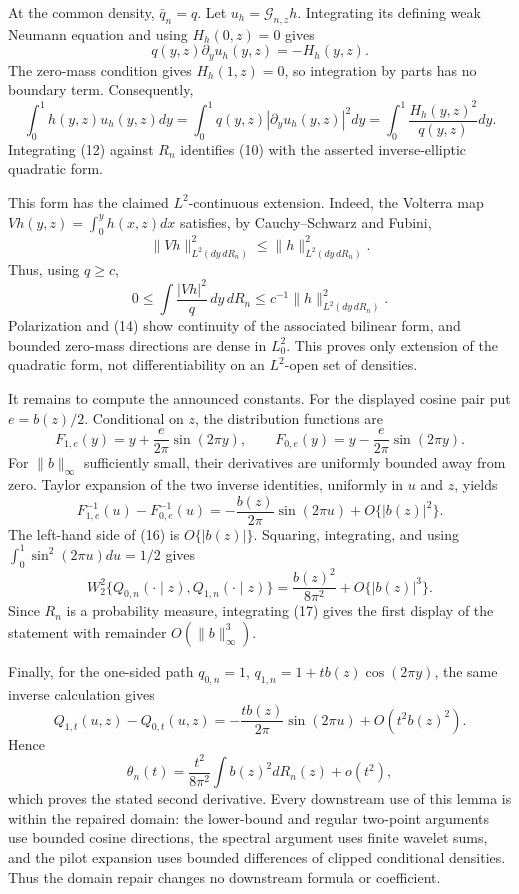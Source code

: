 At the common density, \(\bar q_n=q\). Let \(u_h=\mathcal G_{n,z}h\). Integrating its defining weak Neumann equation and using \(H_h(0,z)=0\) gives
\[
q(y,z)\partial_yu_h(y,z)=-H_h(y,z).
\tag{11}
\]
The zero-mass condition gives \(H_h(1,z)=0\), so integration by parts has no boundary term. Consequently,
\[
\int_0^1h(y,z)u_h(y,z)dy
=\int_0^1q(y,z)|\partial_yu_h(y,z)|^2dy
=\int_0^1\frac{H_h(y,z)^2}{q(y,z)}dy.
\tag{12}
\]
Integrating (12) against \(R_n\) identifies (10) with the asserted inverse-elliptic quadratic form.

This form has the claimed \(L^2\)-continuous extension. Indeed, the Volterra map \(Vh(y,z)=\int_0^yh(x,z)dx\) satisfies, by Cauchy--Schwarz and Fubini,
\[
\|Vh\|_{L^2(dy\,dR_n)}^2
\le\|h\|_{L^2(dy\,dR_n)}^2.
\tag{13}
\]
Thus, using \(q\ge c\),
\[
0\le\int\frac{|Vh|^2}{q}\,dy\,dR_n
\le c^{-1}\|h\|_{L^2(dy\,dR_n)}^2.
\tag{14}
\]
Polarization and (14) show continuity of the associated bilinear form, and bounded zero-mass directions are dense in \(L_0^2\). This proves only extension of the quadratic form, not differentiability on an \(L^2\)-open set of densities.

It remains to compute the announced constants. For the displayed cosine pair put \(e=b(z)/2\). Conditional on \(z\), the distribution functions are
\[
F_{1,e}(y)=y+\frac{e}{2\pi}\sin(2\pi y),
\qquad
F_{0,e}(y)=y-\frac{e}{2\pi}\sin(2\pi y).
\tag{15}
\]
For \(\|b\|_\infty\) sufficiently small, their derivatives are uniformly bounded away from zero. Taylor expansion of the two inverse identities, uniformly in \(u\) and \(z\), yields
\[
F_{1,e}^{-1}(u)-F_{0,e}^{-1}(u)
=-\frac{b(z)}{2\pi}\sin(2\pi u)+O\{|b(z)|^2\}.
\tag{16}
\]
The left-hand side of (16) is \(O\{|b(z)|\}\). Squaring, integrating, and using \(\int_0^1\sin^2(2\pi u)du=1/2\) gives
\[
W_2^2\{Q_{0,n}(\cdot\mid z),Q_{1,n}(\cdot\mid z)\}
=\frac{b(z)^2}{8\pi^2}+O\{|b(z)|^3\}.
\tag{17}
\]
Since \(R_n\) is a probability measure, integrating (17) gives the first display of the statement with remainder \(O(\|b\|_\infty^3)\).

Finally, for the one-sided path \(q_{0,n}=1\), \(q_{1,n}=1+t b(z)\cos(2\pi y)\), the same inverse calculation gives
\[
Q_{1,t}(u,z)-Q_{0,t}(u,z)
=-\frac{t b(z)}{2\pi}\sin(2\pi u)+O(t^2b(z)^2).
\tag{18}
\]
Hence
\[
\theta_n(t)=\frac{t^2}{8\pi^2}\int b(z)^2dR_n(z)+o(t^2),
\tag{19}
\]
which proves the stated second derivative. Every downstream use of this lemma is within the repaired domain: the lower-bound and regular two-point arguments use bounded cosine directions, the spectral argument uses finite wavelet sums, and the pilot expansion uses bounded differences of clipped conditional densities. Thus the domain repair changes no downstream formula or coefficient.